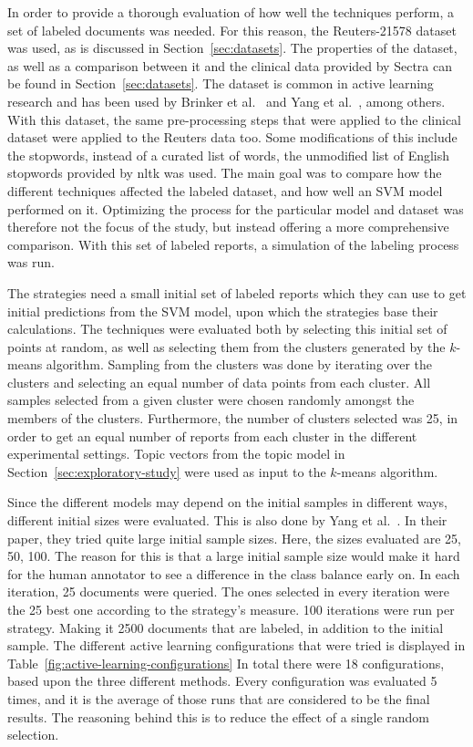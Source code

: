 In order to provide a thorough evaluation of how well the techniques perform, a set of labeled documents was needed.
For this reason, the Reuters-21578 dataset was used, as is discussed in Section~\ref{sec:datasets}. 
The properties of the dataset, as well as a comparison between it and the clinical data provided by Sectra can be found in Section~\ref{sec:datasets}.
The dataset is common in active learning research and has been used by Brinker et al\@.~\cite{brinker2006active} and Yang et al\@.~\cite{yang2009effective}, among others.
With this dataset, the same pre-processing steps that were applied to the clinical dataset were applied to the Reuters data too.
Some modifications of this include the stopwords, instead of a curated list of words, the unmodified list of English stopwords provided by nltk was used.
The main goal was to compare how the different techniques affected the labeled dataset, and how well an SVM model performed on it.
Optimizing the process for the particular model and dataset was therefore not the focus of the study, but instead offering a more comprehensive comparison.
With this set of labeled reports, a simulation of the labeling process was run.

The strategies need a small initial set of labeled reports which they can use to get initial predictions from the SVM model, upon which the strategies base their calculations.
The techniques were evaluated both by selecting this initial set of points at random, as well as selecting them from the clusters generated by the $k$-means algorithm.
Sampling from the clusters was done by iterating over the clusters and selecting an equal number of data points from each cluster.
All samples selected from a given cluster were chosen randomly amongst the members of the clusters.
Furthermore, the number of clusters selected was 25, in order to get an equal number of reports from each cluster in the different experimental settings.
Topic vectors from the topic model in Section~\ref{sec:exploratory-study} were used as input to the $k$-means algorithm.

Since the different models may depend on the initial samples in different ways, different initial sizes were evaluated.
This is also done by Yang et al\@.~\cite{yang2009effective}.
In their paper, they tried quite large initial sample sizes.
Here, the sizes evaluated are 25, 50, 100.
The reason for this is that a large initial sample size would make it hard for the human annotator to see a difference in the class balance early on.
In each iteration, 25 documents were queried.
The ones selected in every iteration were the 25 best one according to the strategy's measure.
100 iterations were run per strategy.
Making it 2500 documents that are labeled, in addition to the initial sample.
The different active learning configurations that were tried is displayed in Table~\ref{fig:active-learning-configurations}
In total there were 18 configurations, based upon the three different methods.
Every configuration was evaluated 5 times, and it is the average of those runs that are considered to be the final results.
The reasoning behind this is to reduce the effect of a single random selection.

